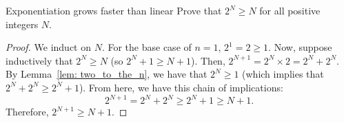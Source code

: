 \begin{problem}{Exponentiation grows faster than linear}
    Prove that $2^N \geq N$ for all positive integers $N$.
\end{problem}
\begin{proof}
    We induct on $N$. 
    For the base case of $n = 1$, $2^1 = 2 \geq 1.$
    Now, suppose inductively that $2^N \geq N$ (so $2^N + 1 \geq N + 1$).
    Then, $2^{N + 1} = 2^N \times 2 = 2^N + 2^N.$
    By Lemma~\ref{lem: two_to_the_n}, we have that $2^N \geq 1$ (which implies that $2^N + 2^N \geq 2^N + 1$).
    From here, we have this chain of implications:
    $$2^{N+1} = 2^N + 2^N \geq 2^N + 1 \geq N + 1.$$  Therefore, $2^{N+1} \geq N + 1.$
\end{proof}